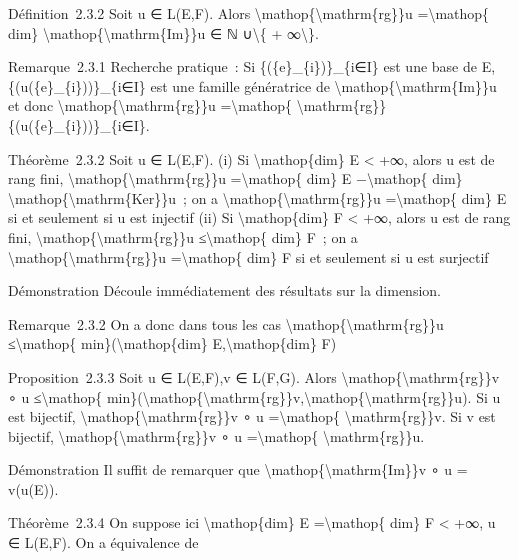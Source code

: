 \documentclass[]{article}
\begin{document}
Définition~2.3.2 Soit u ∈ L(E,F). Alors
\textbackslash{}mathop\{\textbackslash{}mathrm\{rg\}\}u
=\textbackslash{}mathop\{ dim\}
\textbackslash{}mathop\{\textbackslash{}mathrm\{Im\}\}u ∈ ℕ
∪\textbackslash{}\{ + ∞\textbackslash{}\}.

Remarque~2.3.1 Recherche pratique~: Si \{(\{e\}\_\{i\})\}\_\{i∈I\} est
une base de E, \{(u(\{e\}\_\{i\}))\}\_\{i∈I\} est une famille
génératrice de \textbackslash{}mathop\{\textbackslash{}mathrm\{Im\}\}u
et donc \textbackslash{}mathop\{\textbackslash{}mathrm\{rg\}\}u
=\textbackslash{}mathop\{
\textbackslash{}mathrm\{rg\}\}\{(u(\{e\}\_\{i\}))\}\_\{i∈I\}.

Théorème~2.3.2 Soit u ∈ L(E,F). (i) Si \textbackslash{}mathop\{dim\} E
\textless{} +∞, alors u est de rang fini,
\textbackslash{}mathop\{\textbackslash{}mathrm\{rg\}\}u
=\textbackslash{}mathop\{ dim\} E −\textbackslash{}mathop\{ dim\}
\textbackslash{}mathop\{\textbackslash{}mathrm\{Ker\}\}u~; on a
\textbackslash{}mathop\{\textbackslash{}mathrm\{rg\}\}u
=\textbackslash{}mathop\{ dim\} E si et seulement si u est injectif (ii)
Si \textbackslash{}mathop\{dim\} F \textless{} +∞, alors u est de rang
fini, \textbackslash{}mathop\{\textbackslash{}mathrm\{rg\}\}u
≤\textbackslash{}mathop\{ dim\} F~; on a
\textbackslash{}mathop\{\textbackslash{}mathrm\{rg\}\}u
=\textbackslash{}mathop\{ dim\} F si et seulement si u est surjectif

Démonstration Découle immédiatement des résultats sur la dimension.

Remarque~2.3.2 On a donc dans tous les cas
\textbackslash{}mathop\{\textbackslash{}mathrm\{rg\}\}u
≤\textbackslash{}mathop\{ min\}(\textbackslash{}mathop\{dim\}
E,\textbackslash{}mathop\{dim\} F)

Proposition~2.3.3 Soit u ∈ L(E,F),v ∈ L(F,G). Alors
\textbackslash{}mathop\{\textbackslash{}mathrm\{rg\}\}v ∘ u
≤\textbackslash{}mathop\{
min\}(\textbackslash{}mathop\{\textbackslash{}mathrm\{rg\}\}v,\textbackslash{}mathop\{\textbackslash{}mathrm\{rg\}\}u).
Si u est bijectif,
\textbackslash{}mathop\{\textbackslash{}mathrm\{rg\}\}v ∘ u
=\textbackslash{}mathop\{ \textbackslash{}mathrm\{rg\}\}v. Si v est
bijectif, \textbackslash{}mathop\{\textbackslash{}mathrm\{rg\}\}v ∘ u
=\textbackslash{}mathop\{ \textbackslash{}mathrm\{rg\}\}u.

Démonstration Il suffit de remarquer que
\textbackslash{}mathop\{\textbackslash{}mathrm\{Im\}\}v ∘ u = v(u(E)).

Théorème~2.3.4 On suppose ici \textbackslash{}mathop\{dim\} E
=\textbackslash{}mathop\{ dim\} F \textless{} +∞, u ∈ L(E,F). On a
équivalence de
\end{document}
